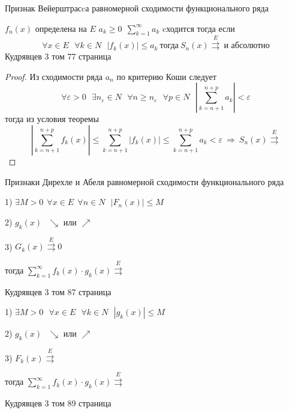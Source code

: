\begin{title}[\Large]
  Признак Вейерштрасcа равномерной сходимости функционального ряда
\end{title}

\begin{block}
  $f_n(x)$ определена на $E$ $a_k \ge 0 ~~ \sum_{k=1}^{\infty}a_k$ cходится
  тогда если
  $$
  \forall x \in E ~~~ \forall k \in N~~~ |f_k(x)| \le a_k ~ \text{тогда} ~
  S_n (x) \stackrel{E}{\rightrightarrows} ~ \text{и абсолютно}
  $$
  Кудрявцев 3 том 77 страница
\end{block}

\begin{proof}
  Из сходимости ряда $a_n$ по критерию Коши следует
  $$
  \forall \varepsilon > 0 ~~~ \exists n_{\varepsilon} \in N ~~~ \forall n \ge
  n_{\varepsilon} ~~~ \forall p \in N ~~~ \left| \sum_{k=n+1}^{n+p} a_k \right|
  < \varepsilon
  $$
  тогда из условия теоремы
  $$
  \left| \sum_{k = n + 1}^{n+p} f_k(x) \right| \le
  \sum_{k = n + 1}^{n+p} |f_k(x)| \le \sum_{k = n+1}^{n+p} a_k < \varepsilon ~
  \Rightarrow ~ S_n(x)\stackrel{E}{\rightrightarrows}
  $$
\end{proof}

\begin{title}[\Large]
  Признаки Дирехле и Абеля равномерной сходимости функционального ряда
\end{title}

\begin{block}
  1) $\exists M > 0 ~~ \forall x \in E ~~ \forall n \in N ~~~ |F_n(x)| \le M$

  2) $g_k(x) ~~~ \searrow$ или $\nearrow$

  3) $G_k(x) \stackrel{E}{\rightrightarrows} 0$

  тогда $\sum_{k=1}^{\infty} f_k(x) \cdot g_k(x)\stackrel{E}{\rightrightarrows}$

  Кудрявцев 3 том 87 страница
\end{block}

\begin{block}
  1) $\exists M > 0 ~~~ \forall x \in E ~~~ \forall k \in N ~~~ |g_k(x)| \le M$

  2) $g_k(x) ~~~ \searrow$ или $\nearrow$

  3) $F_k(x) \stackrel{E}{\rightrightarrows}$

  тогда $\sum_{k=1}^{\infty} f_k(x) \cdot g_k(x)\stackrel{E}{\rightrightarrows}$

  Кудрявцев 3 том 89 страница
\end{block}

